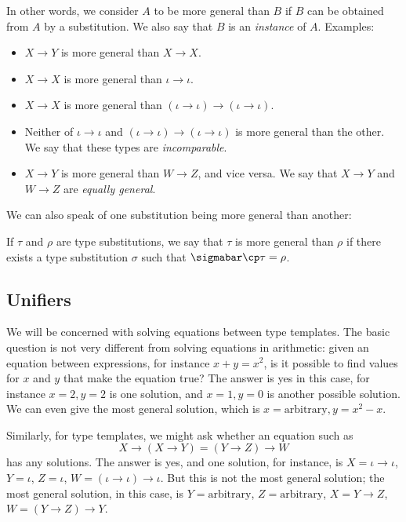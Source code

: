 \documentclass[12pt]{article}
\begin{document}
In other words, we consider $A$ to be more general than $B$ if $B$ can
be obtained from $A$ by a substitution. We also say that $B$ is an
{\em instance} of $A$. Examples:

\begin{itemize}
\item $X\to Y$ is more general than $X\to X$.
\item $X\to X$ is more general than $\iota\to\iota$. 
\item $X\to X$ is more general than $(\iota\to\iota)\to(\iota\to\iota)$.
\item Neither of $\iota\to\iota$ and
  $(\iota\to\iota)\to(\iota\to\iota)$ is more general than the
  other. We say that these types are {\em incomparable}.
\item $X\to Y$ is more general than $W\to Z$, and vice versa. We say
  that $X\to Y$ and $W\to Z$ are {\em equally general}.
\end{itemize}

We can also speak of one substitution being more general than another:
\begin{definition}
  If $\tau$ and $\rho$ are type substitutions, we say that $\tau$
  is more general than $\rho$ if there exists a type substitution
  $\sigma$ such that $\sigmabar\cp\tau=\rho$. 
\end{definition}

\subsection{Unifiers}

We will be concerned with solving equations between type templates. 
The basic question is not very different from solving equations in
arithmetic: given an equation between expressions, for instance
$x+y=x^2$, is it possible to find values for $x$ and $y$ that make
the equation true? The answer is yes in this case, for instance
$x=2,y=2$ is one solution, and $x=1,y=0$ is another possible
solution. We can even give the most general solution, which is
$x=\mbox{arbitrary}, y=x^2-x$. 

Similarly, for type templates, we might ask whether an equation such
as 
\[ X\to(X\to Y)=(Y\to Z)\to W
\]
has any solutions. The answer is yes, and one solution, for instance,
is $X=\iota\to\iota$, $Y=\iota$, $Z=\iota$,
$W=(\iota\to\iota)\to\iota$. But this is not the most general
solution; the most general solution, in this case, is
$Y=\mbox{arbitrary}$, $Z=\mbox{arbitrary}$, $X=Y\to Z$, $W=(Y\to Z)\to
Y$.
\end{document}
